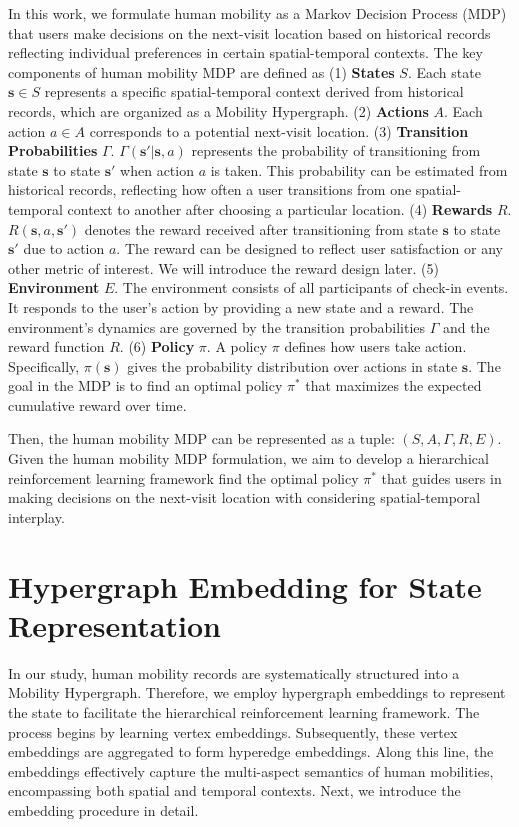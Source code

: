 \documentclass[letterpaper]{article} %
\begin{document}
In this work, we formulate human mobility as a Markov Decision Process (MDP) that users make decisions on the next-visit location based on historical records reflecting individual preferences in certain spatial-temporal contexts. The key components of human mobility MDP are defined as
(1) \textbf{States} $S$. Each state $\mathbf{s} \in S$ represents a specific spatial-temporal context derived from historical records, which are organized as a Mobility Hypergraph. 
(2) \textbf{Actions} $A$. Each action $a \in A$ corresponds to a potential next-visit location. 
(3) \textbf{Transition Probabilities} $\Gamma$. $\Gamma(\mathbf{s}'|\mathbf{s}, a)$ represents the probability of transitioning from state $\mathbf{s}$ to state $\mathbf{s}'$ when action $a$ is taken. This probability can be estimated from historical records, reflecting how often a user transitions from one spatial-temporal context to another after choosing a particular location.
(4) \textbf{Rewards} $R$. $R(\mathbf{s}, a, \mathbf{s}')$ denotes the reward received after transitioning from state $\mathbf{s}$ to state $\mathbf{s}'$ due to action $a$. The reward can be designed to reflect user satisfaction or any other metric of interest. We will introduce the reward design later.
(5) \textbf{Environment} $E$. The environment consists of all participants of check-in events. It responds to the user's action by providing a new state and a reward. The environment's dynamics are governed by the transition probabilities $\Gamma$ and the reward function $R$.
(6) \textbf{Policy} $\pi$. A policy $\pi$ defines how users take action. Specifically, $\pi(\mathbf{s})$ gives the probability distribution over actions in state $\mathbf{s}$. The goal in the MDP is to find an optimal policy $\pi^*$ that maximizes the expected cumulative reward over time.

Then, the human mobility MDP can be represented as a tuple:
$(S, A, \Gamma, R, E) $.
Given the human mobility MDP formulation, we aim to develop a hierarchical reinforcement learning framework find the optimal policy $\pi^*$ that guides users in making decisions on the next-visit location with considering spatial-temporal interplay.


\section{Hypergraph Embedding for State Representation}
In our study, human mobility records are systematically structured into a Mobility Hypergraph. 
Therefore, we employ hypergraph embeddings to represent the state to facilitate the hierarchical reinforcement learning framework. 
The process begins by learning vertex embeddings. 
Subsequently, these vertex embeddings are aggregated to form hyperedge embeddings. 
Along this line, the embeddings effectively capture the multi-aspect semantics of human mobilities, encompassing both spatial and temporal contexts. 
Next, we introduce the embedding procedure in detail.
\end{document}
